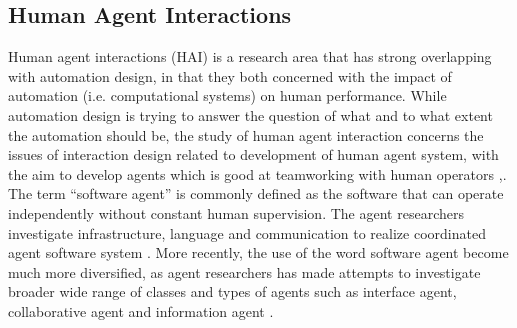 
\subsection{Human Agent Interactions}\label{sec:LRHAI}
Human agent interactions (HAI) is a research area that has strong overlapping with automation design, in that they both concerned with the impact of automation (i.e. computational systems) on human performance. While automation design is trying to answer the question of what and to what extent the automation should be, the study of human agent interaction concerns the issues of interaction design related to development of human agent system, with the aim to develop agents which is good at teamworking with human operators \cite{Bradshaw2011},\cite{Sukthankara}. \\

The term ``software agent'' is commonly defined as the software that can operate independently without constant human supervision\cite{Vlassis2007}. The agent researchers investigate infrastructure, language and communication to realize coordinated agent software system \cite{Nwana1996}. More recently, the use of the word software agent become much more diversified, as agent researchers has made attempts to investigate broader wide range of classes and types of agents such as interface agent, collaborative agent and information agent \cite{Nwana1996}.  \\

